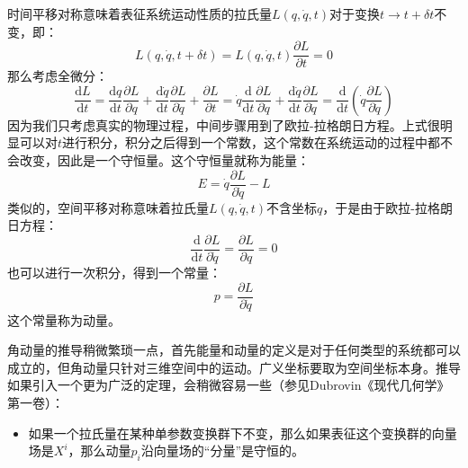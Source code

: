 \documentclass{ctexart}
\begin{document}
时间平移对称意味着表征系统运动性质的拉氏量$L(q,\dot{q},t)$对于变换$t\to t+\delta t$不变，即：
\begin{equation}
L(q,\dot{q},t+\delta t)=L(q,\dot{q},t)
\frac{\partial L}{\partial t}=0
\end{equation}
那么考虑全微分：
\begin{equation}
\frac{\mathrm{d}L}{\mathrm{d}t}=\frac{\mathrm{d}q}{\mathrm{d}t}\frac{\partial L}{\partial q}+\frac{\mathrm{d}\dot{q}}{\mathrm{d}t}\frac{\partial L}{\partial \dot{q}}+\frac{\partial L}{\partial t}=\dot{q}\frac{\mathrm{d}}{\mathrm{d}t}\frac{\partial L}{\partial \dot{q}}+\frac{\mathrm{d}\dot{q}}{\mathrm{d}t}\frac{\partial L}{\partial \dot{q}}=\frac{\mathrm{d}}{\mathrm{d}t}\left(\dot{q}\frac{\partial L}{\partial \dot{q}}\right)
\end{equation}
因为我们只考虑真实的物理过程，中间步骤用到了欧拉-拉格朗日方程。上式很明显可以对$t$进行积分，积分之后得到一个常数，这个常数在系统运动的过程中都不会改变，因此是一个守恒量。这个守恒量就称为能量：
\begin{equation}
E=\dot{q}\frac{\partial L}{\partial\dot{q}}-L
\end{equation}
类似的，空间平移对称意味着拉氏量$L(q,\dot{q},t)$不含坐标$q$，于是由于欧拉-拉格朗日方程：
\begin{equation}
\frac{\mathrm{d}}{\mathrm{d}t}\frac{\partial L}{\partial \dot{q}}=\frac{\partial L}{\partial q}=0
\end{equation}
也可以进行一次积分，得到一个常量：
\begin{equation}
p=\frac{\partial L}{\partial\dot{q}}
\end{equation}
这个常量称为动量。

角动量的推导稍微繁琐一点，首先能量和动量的定义是对于任何类型的系统都可以成立的，但角动量只针对三维空间中的运动。广义坐标要取为空间坐标本身。推导如果引入一个更为广泛的定理，会稍微容易一些（参见Dubrovin《现代几何学》第一卷）：
\begin{itemize}
\item 如果一个拉氏量在某种单参数变换群下不变，那么如果表征这个变换群的向量场是$X^i$，那么动量$p_i$沿向量场的“分量”是守恒的。
\end{itemize}
\end{document}
